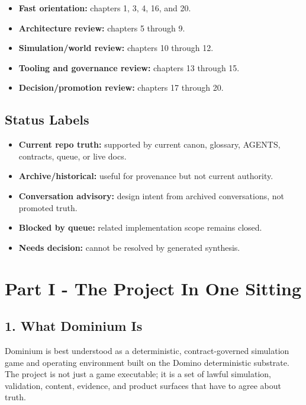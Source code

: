 \documentclass[10.5pt,a4paper,openany]{book}
\begin{document}
\begin{itemize}
\item \textbf{Fast orientation:} chapters 1, 3, 4, 16, and 20.\allowbreak{}
\item \textbf{Architecture review:} chapters 5 through 9.\allowbreak{}
\item \textbf{Simulation/world review:} chapters 10 through 12.\allowbreak{}
\item \textbf{Tooling and governance review:} chapters 13 through 15.\allowbreak{}
\item \textbf{Decision/promotion review:} chapters 17 through 20.\allowbreak{}
\end{itemize}

\section{Status Labels}

\begin{itemize}
\item \textbf{Current repo truth:} supported by current canon, glossary, AGENTS, contracts, queue, or live docs.\allowbreak{}
\item \textbf{Archive/historical:} useful for provenance but not current authority.\allowbreak{}
\item \textbf{Conversation advisory:} design intent from archived conversations, not promoted truth.\allowbreak{}
\item \textbf{Blocked by queue:} related implementation scope remains closed.\allowbreak{}
\item \textbf{Needs decision:} cannot be resolved by generated synthesis.\allowbreak{}
\end{itemize}


\chapter{Part I - The Project In One Sitting}


\section{1. What Dominium Is}

Dominium is best understood as a deterministic, contract-\allowbreak{}governed simulation game and operating environment built on the Domino deterministic substrate.\allowbreak{} The project is not just a game executable; it is a set of lawful simulation, validation, content, evidence, and product surfaces that have to agree about truth.\allowbreak{}
\end{document}
